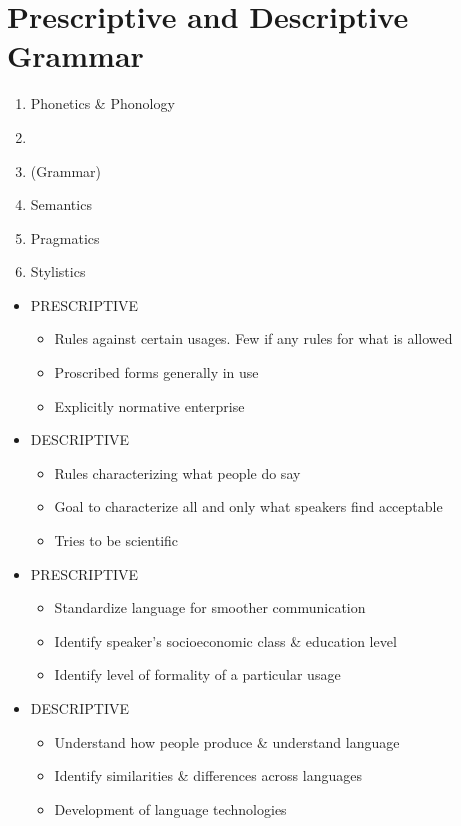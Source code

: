 \documentclass[a4paper,landscape,headrule,footrule]{foils}
\begin{document}
\section{Prescriptive and Descriptive Grammar}

\begin{enumerate}\addtolength{\itemsep}{-0.75ex}
\item Phonetics \& Phonology
\item {}
\item {} (Grammar)
\item Semantics 
\item Pragmatics
\item Stylistics
\end{enumerate}


\begin{itemize}
\item
PRESCRIPTIVE
\begin{itemize}
\item Rules against certain
usages. Few if any
rules for what is
allowed
\item Proscribed forms
generally in use
\item Explicitly normative
enterprise
\end{itemize}
\item DESCRIPTIVE
\begin{itemize}
\item Rules characterizing
what people do say
\item Goal to characterize all
and only what speakers
find acceptable
\item Tries to be scientific
\end{itemize}
\end{itemize}


\begin{itemize}
\item PRESCRIPTIVE
  \begin{itemize}
  \item Standardize language for smoother communication
  \item Identify speaker’s socioeconomic class \& education level
  \item Identify level of formality of a  particular usage
  \end{itemize}
\item DESCRIPTIVE
  \begin{itemize}
  \item Understand how
    people produce \&
    understand language
  \item Identify similarities
    \& differences across
    languages
  \item Development of
    language technologies
  \end{itemize}
\end{itemize}
\end{document}
